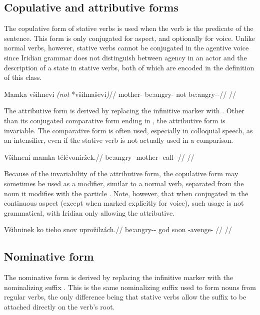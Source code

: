 \subsection{Copulative and attributive forms}
The copulative form of stative verbs is used when the verb is the predicate of the sentence. This form is only conjugated for aspect, and optionally for voice. Unlike normal verbs, however, stative verbs cannot be conjugated in the agentive voice since Iridian grammar does not distinguish between agency in an actor and the description of a state in stative verbs, both of which are encoded in the definition of this class. 

\ex
\begingl
\gla Mamka všihneví \emph{(not} *všihnaševí\emph{)}//
\glb mother- be:angry- not be:angry-\Av{}-\Cont{}//
\glft {}//
\endgl
\xe


The attributive form is derived by replacing the infinitive marker  with . Other than its conjugated comparative form ending in , the attributive form is invariable. The comparative form is often used, especially in colloquial speech, as an intensifier, even if the stative verb is not actually used in a comparison.

\ex
\begingl
\gla Všihnení mamka t\'el\'evoniržek.//
\glb be:angry- mother- call-\Av{}-\Pf{}//
\glft {}//
\endgl
\xe

Because of the invariability of the attributive form, the copulative form may sometimes be used as a modifier, similar to a normal verb, separated from the noun it modifies with the particle . Note, however, that when conjugated in the continuous aspect (except when marked explicitly for voice), such usage is not grammatical, with Iridian only allowing the attributive.

\ex
\begingl
\gla Všihninek ko tieho snov uprožilzách.//
\glb be:angry-\Pv{}-\Pf{} \Att{} god soon \Refl{}-avenge- //
\glft {}//
\endgl
\xe


\subsection{Nominative form}
The nominative form is derived by replacing the infinitive marker  with the nominalizing suffix . This is the same nominalizing suffix used to form nouns from regular verbs, the only difference being that stative verbs allow the suffix to be attached directly on the verb's root.

